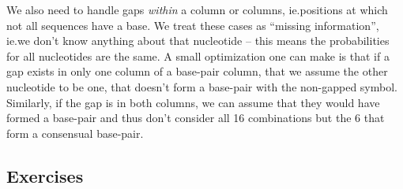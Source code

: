 We also need to handle gaps \emph{within} a column or columns, ie.\@ positions
at which not all sequences have a base.  We treat these cases as
\enquote{missing information}, ie.\@ we don't know anything about that
nucleotide -- this means the probabilities for all nucleotides are the same.
A small optimization one can make is that if a gap exists in only one column
of a base-pair column, that we assume the other nucleotide to be one, that
doesn't form a base-pair with the non-gapped symbol.  Similarly, if the gap is
in both columns, we can assume that they would have formed a base-pair and thus
don't consider all 16 combinations but the 6 that form a consensual base-pair.

\subsection*{Exercises}
